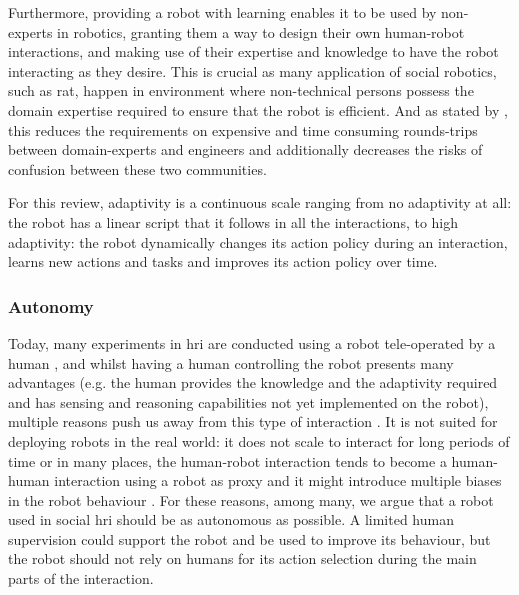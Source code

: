 	Furthermore, providing a robot with learning enables it to be used by non-experts in robotics, granting them a way to design their own human-robot interactions, and making use of their expertise and knowledge to have the robot interacting as they desire. This is crucial as many application of social robotics, such as \gls{rat}, happen in environment where non-technical persons possess the domain expertise required to ensure that the robot is efficient. And as stated by \cite{amershi2014power}, this reduces the requirements on expensive and time consuming rounds-trips between domain-experts and engineers and additionally decreases the risks of confusion between these two communities.

    For this review, adaptivity is a continuous scale ranging from no adaptivity at all: the robot has a linear script that it follows in all the interactions, to high adaptivity: the robot dynamically changes its action policy during an interaction, learns new actions and tasks and improves its action policy over time. 

\subsubsection{Autonomy}
	
	Today, many experiments in \gls{hri} are conducted using a robot tele-operated by a human \citep{riek2012wizard,baxter2016characterising}, and whilst having a human controlling the robot presents many advantages (e.g. the human provides the knowledge and the adaptivity required and has sensing and reasoning capabilities not yet implemented on the robot), multiple reasons push us away from this type of interaction \citep{Thill2013}. It is not suited for deploying robots in the real world: it does not scale to interact for long periods of time or in many places, the human-robot interaction tends to become a human-human interaction using a robot as proxy \citep{baxter2016characterising} and it might introduce multiple biases in the robot behaviour \citep{howley2014effects}. For these reasons, among many, we argue that a robot used in social \gls{hri} should be as autonomous as possible. A limited human supervision could support the robot and be used to improve its behaviour, but the robot should not rely on humans for its action selection during the main parts of the interaction. 
		
